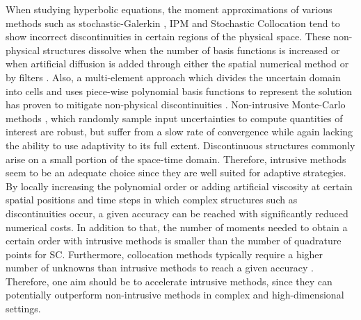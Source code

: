 When studying hyperbolic equations, the moment approximations of various methods such as stochastic-Galerkin \cite{le2004uncertainty,kusch2018filtered}, IPM \cite{kusch2018filtered,poette2019contribution} and Stochastic Collocation \cite{barth2013non,dwight2013adaptive} tend to show incorrect discontinuities in certain regions of the physical space. These non-physical structures dissolve when the number of basis functions is increased \cite{pettersson2009numerical,offner2017stability} or when artificial diffusion is added through either the spatial numerical method \cite{offner2017stability} or by filters \cite{kusch2018filtered}. Also, a multi-element approach which divides the uncertain domain into cells and uses piece-wise polynomial basis functions to represent the solution has proven to mitigate non-physical discontinuities \cite{wan2006multi,durrwachter2018hyperbolicity}. Non-intrusive Monte-Carlo methods \cite{mishra2012multi,mishra2012sparse,mishra2016numerical}, which randomly sample input uncertainties to compute quantities of interest are robust, but suffer from a slow rate of convergence while again lacking the ability to use adaptivity to its full extent. Discontinuous structures commonly arise on a small portion of the space-time domain. Therefore, intrusive methods seem to be an adequate choice since they are well suited for adaptive strategies. By locally increasing the polynomial order \cite{tryoen2012adaptive,kroker2012finite,giesselmann2017posteriori} or adding artificial viscosity \cite{kusch2018filtered} at certain spatial positions and time steps in which complex structures such as discontinuities occur, a given accuracy can be reached with significantly reduced numerical costs. In addition to that, the number of moments needed to obtain a certain order with intrusive methods is smaller than the number of quadrature points for SC. Furthermore, collocation methods typically require a higher number of unknowns than intrusive methods to reach a given accuracy \cite{xiu2009fast,alekseev2011estimation}. Therefore, one aim should be to accelerate intrusive methods, since they can potentially outperform non-intrusive methods in complex and high-dimensional settings. \\

